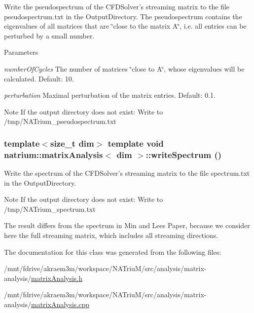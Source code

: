 Write the pseudospectrum of the CFDSolver's streaming matrix to the file pseudospectrum.txt in the OutputDirectory. The pseudospectrum contains the eigenvalues of all matrices that are \char`\"{}close to the matrix A\char`\"{}, i.e. all entries can be perturbed by a small number. 
\begin{DoxyParams}{Parameters}
\item[{\em numberOfCycles}]The number of matrices \char`\"{}close to A\char`\"{}, whose eigenvalues will be calculated. Default: 10. \item[{\em perturbation}]Maximal perturbation of the matrix entries. Default: 0.1. \end{DoxyParams}
\begin{DoxyNote}{Note}
If the output directory does not exist: Write to /tmp/NATrium\_\-pseudospectrum.txt 
\end{DoxyNote}
\hypertarget{classnatrium_1_1matrixAnalysis_af83535a0c1c83db223649b958c245df1}{
\subsubsection[{writeSpectrum}]{\setlength{\rightskip}{0pt plus 5cm}template$<$size\_\-t dim$>$ template void {\bf natrium::matrixAnalysis}$<$ dim $>$::writeSpectrum ()}}
\label{classnatrium_1_1matrixAnalysis_af83535a0c1c83db223649b958c245df1}


Write the spectrum of the CFDSolver's streaming matrix to the file spectrum.txt in the OutputDirectory. \begin{DoxyNote}{Note}
If the output directory does not exist: Write to /tmp/NATrium\_\-spectrum.txt 

The result differs from the spectrum in Min and Lees Paper, because we consider here the full streaming matrix, which includes all streaming directions. 
\end{DoxyNote}


The documentation for this class was generated from the following files:\begin{DoxyCompactItemize}
\item 
/mnt/fdrive/akraem3m/workspace/NATriuM/src/analysis/matrix-\/analysis/\hyperlink{matrixAnalysis_8h}{matrixAnalysis.h}\item 
/mnt/fdrive/akraem3m/workspace/NATriuM/src/analysis/matrix-\/analysis/\hyperlink{matrixAnalysis_8cpp}{matrixAnalysis.cpp}\end{DoxyCompactItemize}
